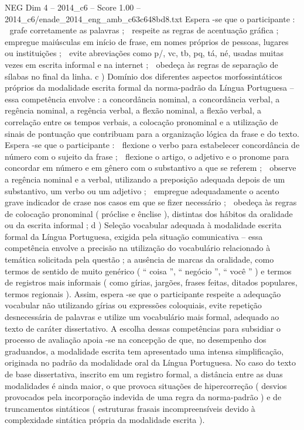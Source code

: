 \begin{textsample}{NEG Dim 4 – 2014\_c6 – Score 1.00 – 2014\_c6/enade\_2014\_eng\_amb\_c63c648bd8.txt}
Espera -se que o participante :  grafe corretamente as palavras ;  respeite as regras de acentuação gráfica ;  empregue maiúsculas em início de frase, em nomes próprios de pessoas, lugares ou instituições ;  evite abreviações como p/, vc, tb, pq, tá, né, usadas muitas vezes em escrita informal e na internet ;  obedeça às regras de separação de sílabas no final da linha. c ) Domínio dos diferentes aspectos morfossintáticos próprios da modalidade escrita formal da norma-padrão da Língua Portuguesa – essa competência envolve : a concordância nominal, a concordância verbal, a regência nominal, a regência verbal, a flexão nominal, a flexão verbal, a correlação entre os tempos verbais, a colocação pronominal e a utilização de sinais de pontuação que contribuam para a organização lógica da frase e do texto.
Espera -se que o participante :  flexione o verbo para estabelecer concordância de número com o sujeito da frase ;  flexione o artigo, o adjetivo e o pronome para concordar em número e em gênero com o substantivo a que se referem ;  observe a regência nominal e a verbal, utilizando a preposição adequada depois de um substantivo, um verbo ou um adjetivo ;  empregue adequadamente o acento grave indicador de crase nos casos em que se fizer necessário ;  obedeça às regras de colocação pronominal ( próclise e ênclise ), distintas dos hábitos da oralidade ou da escrita informal ; d ) Seleção vocabular adequada à modalidade escrita formal da Língua Portuguesa, exigida pela situação comunicativa – essa competência envolve a precisão na utilização do vocabulário relacionado à temática solicitada pela questão ; a ausência de marcas da oralidade, como termos de sentido de muito genérico ( “ coisa ”, “ negócio ”, “ você ” ) e termos de registros mais informais ( como gírias, jargões, frases feitas, ditados populares, termos regionais ).
Assim, espera -se que o participante respeite a adequação vocabular não utilizando gírias ou expressões coloquiais, evite repetição desnecessária de palavras e utilize um vocabulário mais formal, adequado ao texto de caráter dissertativo.
A escolha dessas competências para subsidiar o processo de avaliação apoia -se na concepção de que, no desempenho dos graduandos, a modalidade escrita tem apresentado uma intensa simplificação, originada no padrão da modalidade oral da Língua Portuguesa.
No caso do texto de base dissertativa, inscrito em um registro formal, a distância entre as duas modalidades é ainda maior, o que provoca situações de hipercorreção ( desvios provocados pela incorporação indevida de uma regra da norma-padrão ) e de truncamentos sintáticos ( estruturas frasais incompreensíveis devido à complexidade sintática própria da modalidade escrita ).

\end{textsample}
